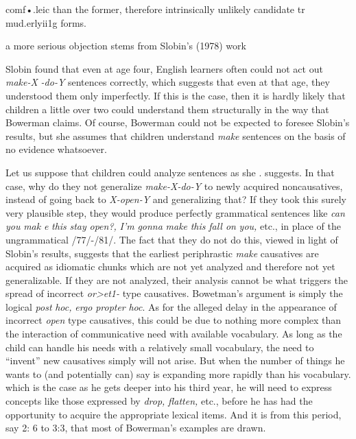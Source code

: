 comf•.leic than the former, therefore intrinsically unlikely candidate tr mud.erlyii1g forms.

a more serious objection stems from Slobin's (1978) work


Slobin found that even at age four, English learners often could not act out \textit{make-X} \textit{{}-do-Y} sentences correctly, which suggests that even at that age, they understood them only imperfectly. If this is the case, then it is hardly likely that children a little over two could understand them structurally in the way that Bowerman claims. Of course, Bower\-man could not be expected to foresee Slobin's results, but she assumes that children understand \textit{make} sentences on the basis of no evidence whatsoever.

Let us suppose that children could analyze sentences as she . suggests. In that case, why do they not generalize \textit{make-X-do-Y }to newly acquired noncausatives, instead of going back to \textit{X-open-Y} and generalizing that? If they took this surely very plausible step, they would produce perfectly grammatical sentences like \textit{can you} \textit{mak} \textit{e} \textit{this} \textit{stay} \textit{open?,} \textit{I'm} \textit{gonna} \textit{make} \textit{this} \textit{fall on} \textit{you,} etc., in place of the ungrammatical /77/-/81/. The fact that they do not do this, viewed in light of Slobin's results, suggests that the earliest periphrastic \textit{make }causatives are acquired as idiomatic chunks which are not yet analyzed and therefore not yet generalizable. If they are not analyzed, their analysis cannot be what triggers the spread of incorrect \textit{or{\textgreater}et1-} type causatives. Bowetman's argument is simply the logical
\textit{post} \textit{hoc,} \textit{ergo} \textit{propter} \textit{hoc}. 
As for the alleged delay in the appearance of incorrect \textit{open\-} type causatives, this could be due to nothing more complex than the interaction of communicative need with available vocabulary. As long as the child can handle his needs with a relatively small vocabulary, the need to ``invent'' new causatives simply will not arise. But when the number of things he wants to (and potentially can) say is expanding more rapidly than his vocabulary. which is the case as he gets deeper into his third year, he will need to express concepts like those expressed by \textit{drop,} \textit{flatten,} etc., before he has had the opportunity to acquire the appropriate lexical items. And it is from this period, say 2: 6 to 3:3, that most of Bowerman's examples are drawn.

